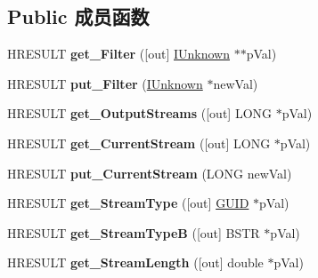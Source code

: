 \subsection*{Public 成员函数}
\begin{DoxyCompactItemize}
\item 
\mbox{\label{interface_i_media_det_a9ee77786d2f3db7776f478f419bedd08}} 
H\+R\+E\+S\+U\+LT {\bfseries get\+\_\+\+Filter} (\mbox{[}out\mbox{]} \hyperlink{interface_i_unknown}{I\+Unknown} $\ast$$\ast$p\+Val)
\item 
\mbox{\label{interface_i_media_det_a8df1b6afbaf82417e12fbad8f00cd3d3}} 
H\+R\+E\+S\+U\+LT {\bfseries put\+\_\+\+Filter} (\hyperlink{interface_i_unknown}{I\+Unknown} $\ast$new\+Val)
\item 
\mbox{\label{interface_i_media_det_a7f782b62d952b1b55fd8311f67ae0354}} 
H\+R\+E\+S\+U\+LT {\bfseries get\+\_\+\+Output\+Streams} (\mbox{[}out\mbox{]} L\+O\+NG $\ast$p\+Val)
\item 
\mbox{\label{interface_i_media_det_a54422381746ddcf45fdc3650693c1046}} 
H\+R\+E\+S\+U\+LT {\bfseries get\+\_\+\+Current\+Stream} (\mbox{[}out\mbox{]} L\+O\+NG $\ast$p\+Val)
\item 
\mbox{\label{interface_i_media_det_a8e34417cb25b2ebc433bba3a572fe1ad}} 
H\+R\+E\+S\+U\+LT {\bfseries put\+\_\+\+Current\+Stream} (L\+O\+NG new\+Val)
\item 
\mbox{\label{interface_i_media_det_aac34d10270c8c5233f0c31ca12fc2691}} 
H\+R\+E\+S\+U\+LT {\bfseries get\+\_\+\+Stream\+Type} (\mbox{[}out\mbox{]} \hyperlink{interface_g_u_i_d}{G\+U\+ID} $\ast$p\+Val)
\item 
\mbox{\label{interface_i_media_det_ac63e642fc312445f507b9cabed8aa6f4}} 
H\+R\+E\+S\+U\+LT {\bfseries get\+\_\+\+Stream\+TypeB} (\mbox{[}out\mbox{]} B\+S\+TR $\ast$p\+Val)
\item 
\mbox{\label{interface_i_media_det_a74abc3a3c2c1bf4798cecfae69dc4f8d}} 
H\+R\+E\+S\+U\+LT {\bfseries get\+\_\+\+Stream\+Length} (\mbox{[}out\mbox{]} double $\ast$p\+Val)
$$
\end{DoxyCompactItemize}
